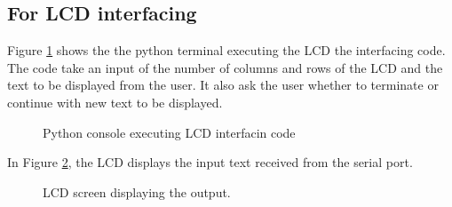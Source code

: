 \documentclass{article}
\begin{document}
\subsection{For LCD interfacing}
Figure \ref{fig:lcd_run} shows the the python terminal executing the LCD the interfacing code. The code take an input of the number of columns and rows of the LCD and the text to be displayed from the user. It also ask the user whether to terminate or continue with new text to be displayed.
\begin{figure}[H]
    \centering
    \caption{Python console executing LCD interfacin code}
    \label{fig:lcd_run}
\end{figure}


In Figure \ref{fig:lcd_output}, the LCD displays the input text received from the serial port.
\begin{figure}[H]
    \centering
    \caption{LCD screen displaying the output.}
    \label{fig:lcd_output}
\end{figure}
\end{document}
